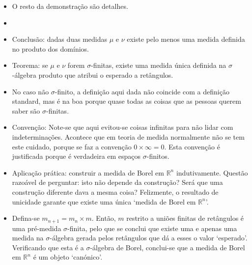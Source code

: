 \documentclass{article}
\newcommand{\R}{\mathbb{R}}
\begin{document}
\begin{itemize}
\item O resto da demonstração são detalhes.
\item{}
\item Conclusão: dadas duas medidas $\mu$ e $\nu$ existe pelo menos uma medida definida no produto dos domínios.
\item Teorema: se $\mu$ e $\nu$ forem $\sigma$-finitas, existe uma medida única definida na $\sigma$-álgebra produto que atribui o esperado a retângulos.
\item No caso não $\sigma$-finito, a definição aqui dada não coincide com a definição standard, mas é na boa porque quase todas as coisas que as pessoas querem saber são $\sigma$-finitas.
\item Convenção: Note-se que aqui evitou-se coisas infinitas para não lidar com indeterminações. Acontece que em teoria de medida normalmente não se tem este cuidado, porque se faz a convenção $0 \times \infty = 0$. Esta convenção é justificada porque é verdadeira em espaços $\sigma$-finitos.
\item Aplicação prática: construir a medida de Borel em $\R^n$ indutivamente. Questão razoável de perguntar: isto não depende da construção? Será que uma construção diferente dava a mesma coisa? Felizmente, o resultado de unicidade garante que existe uma única `medida de Borel em $\R^n$'.
\item Defina-se $m_{n+1} = m_n \times m$. Então, $m$ restrito a uniões finitas de retângulos é uma pré-medida $\sigma$-finita, pelo que se conclui que existe uma e apenas uma medida na $\sigma$-álgebra gerada pelos retângulos que dá a esses o valor `esperado'. Verificando que esta é a $\sigma$-álgebra de Borel, conclui-se que a medida de Borel em $\R^n$ é um objeto `canónico'.
\end{itemize}
\end{document}
